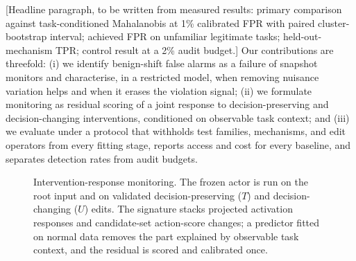 \documentclass[10pt]{article}
\newcommand{\TBD}[1]{\textcolor{BrickRed}{[#1]}}
\begin{document}
\TBD{Headline paragraph, to be written from measured results: primary comparison against
task-conditioned Mahalanobis at 1\% calibrated FPR with paired cluster-bootstrap interval;
achieved FPR on unfamiliar legitimate tasks; held-out-mechanism TPR; control result at a 2\% audit
budget.} Our contributions are threefold: (i) we identify benign-shift false alarms as a failure of
snapshot monitors and characterise, in a restricted model, when removing nuisance variation helps and
when it erases the violation signal; (ii) we formulate monitoring as residual scoring of a joint
response to decision-preserving and decision-changing interventions, conditioned on observable task
context; and (iii) we evaluate under a protocol that withholds test families, mechanisms, and edit
operators from every fitting stage, reports access and cost for every baseline, and separates
detection rates from audit budgets.

\begin{figure}[t]
\centering
{}
\caption{Intervention-response monitoring. The frozen actor is run on the root input and on validated
decision-preserving ($T$) and decision-changing ($U$) edits. The signature stacks projected activation
responses and candidate-set action-score changes; a predictor fitted on normal data removes the part
explained by observable task context, and the residual is scored and calibrated once.}
\label{fig:overview}
\end{figure}
\end{document}
